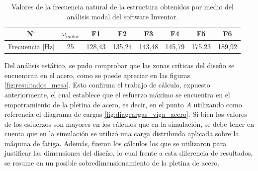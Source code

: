 \begin{table}[h]
\centering
\begin{tabular}{@{}cccccccc@{}}
\toprule
N$^{\circ}$ &  $\omega_{motor}$ & F1 & F2 & F3 & F4 & F5 & F6  \\ \midrule
Frecuencia [Hz] & 25 & 128,43 & 135,24 & 143,48 & 145,79 & 175,23 & 189,92 \\ \bottomrule
\end{tabular} 
\caption{Valores de la frecuencia natural de la estructura obtenidos por medio del análisis modal del software Inventor. }
\label{tab:frec_nat}
\end{table}

Del análisis estático, se pudo comprobar que las zonas críticas del diseño se encuentran en el acero, como se puede apreciar en las figuras \ref{fig:resultados_mesa}. Esto confirma el trabajo de cálculo, expuesto anteriormente, el cual establece que el esfuerzo máximo se encuentra en el empotramiento de la pletina de acero, es decir, en el punto $A$ utilizando como referencia el diagrama de cargas \ref{fig:diagcargas_viga_acero}. Si bien los valores de los esfuerzos son mayores en los cálculos que en la simulación, se debe tener en cuenta que en la simulación se utilizó una carga distribuida aplicada sobre la máquina de fatiga. Además, fueron los cálculos los que se utilizaron para justificar las dimensiones del diseño, lo cual frente a esta diferencia de resultados, se resume en un posible sobredimensionamiento de la pletina de acero.

